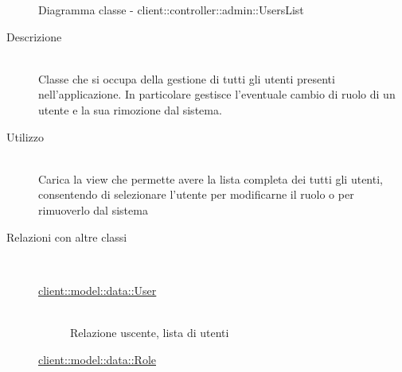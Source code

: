 \begin{figure}[H]
	\centering
	\caption{Diagramma classe - client::controller::admin::UsersList}
\end{figure}\begin{description}
\item[Descrizione] \hfill \\
Classe che si occupa della gestione di tutti gli utenti presenti nell'applicazione. In particolare gestisce l'eventuale cambio di ruolo di un utente e la sua rimozione dal sistema.
\item[Utilizzo] \hfill \\
Carica la view che permette avere la lista completa dei tutti gli utenti, consentendo di selezionare l'utente per modificarne il ruolo o per rimuoverlo dal sistema
\item[Relazioni con altre classi] \hfill \\
\vspace{-7mm}
\begin{description}
	\item[\hyperlink{client::model::data::User}{client::model::data::User}] \hfill \\
	Relazione uscente, lista di utenti
	\item[\hyperlink{client::model::data::Role}{client::model::data::Role}] \hfill \\

\end{description}
\end{description}
